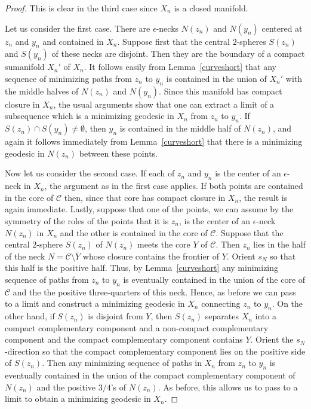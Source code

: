 \begin{proof}
\sketch
This is clear in the third case since $X_n$ is a closed manifold.

Let us consider the first case. There are $\epsilon$-necks $N(z_n)$
and $N(y_n)$ centered at $z_n$ and $y_n$ and contained in $X_n$.
Suppose first that the central $2$-spheres $S(z_n)$ and $S(y_n)$ of
these necks are disjoint. Then they are the boundary of a compact
sumanifold $X_n'$ of $X_n$. It follows easily from
Lemma~\ref{curveshort} that any sequence of minimizing paths from
$z_n$ to $y_n$ is contained in the union of $X_n'$ with the  middle
halves of $N(z_n)$ and $N(y_n)$. Since this manifold has compact
closure in $X_n$, the usual arguments show that one can extract a
limit of a subsequence which is a minimizing geodesic in $X_n$ from
$z_n$ to $y_n$. If $S(z_n)\cap S(y_n)\not=\emptyset$, then $y_n$ is
contained in the middle half of $N(z_n)$, and again it follows
immediately from Lemma~\ref{curveshort} that there is a minimizing
geodesic in $N(z_n)$ between these points.

Now let us consider the second case. If each of $z_n$ and $y_n$ is
the center of an $\epsilon$-neck in $X_n$, the argument as in the
first case applies. If both points are contained in the core of
${\mathcal C}$ then, since that core has compact closure in $X_n$,
the result is again immediate. Lastly, suppose that one of the
points, we can assume by the symmetry of the roles of the points
that it is $z_n$, is the center of an $\epsilon$-neck $N(z_n)$ in
$X_n$ and the other is contained in the core of ${\mathcal C}$.
Suppose that the central $2$-sphere $S(z_n)$ of $N(z_n)$  meets the
core $Y$ of ${\mathcal C}$. Then $z_n$ lies in the  half of the neck
$N={\mathcal C}\setminus \overline Y$ whose closure contains the
frontier of $Y$. Orient $s_N$ so that this half is the positive
half. Thus, by Lemma~\ref{curveshort} any minimizing sequence of
paths from $z_n$ to $y_n$ is eventually contained in the union of
the core of ${\mathcal C}$ and the the positive three-quarters of
this neck. Hence, as before we can pass to a limit and construct  a
minimizing geodesic in $X_n$ connecting $z_n$ to $y_n$. On the other
hand, if $S(z_n)$ is disjoint from $Y$, then $S(z_n)$ separates
$X_n$ into a compact complementary component and a non-compact
complementary component and the compact complementary component
contains $Y$. Orient the $s_N$-direction so that the compact
complementary component lies on the positive side of $S(z_n)$. Then
any minimizing sequence of paths in $X_n$ from $z_n$ to $y_n$ is
eventually contained in the union of the compact complementary
component of $N(z_n)$ and the positive $3/4$'s of $N(z_n)$. As
before, this allows us to pass to a limit to obtain a minimizing
geodesic in $X_n$.
\end{proof}

